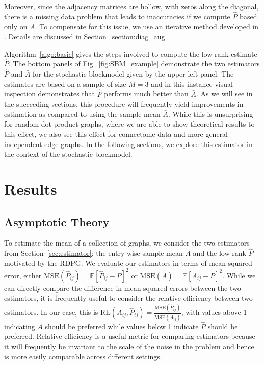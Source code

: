 \documentclass[10pt,letterpaper]{article}
\newcommand{\Ex}{\mathbb{E}}
\renewcommand{\hat}{\widehat}
\begin{document}
Moreover, since the adjacency matrices are hollow, with zeros along the diagonal, there is a missing data problem that leads to inaccuracies if we compute $\hat{P}$ based only on $\bar{A}$. 
To compensate for this issue, we use an iterative method developed in \citet{scheinerman2010modeling}. 
Details are discussed in Section~\ref{section:diag_aug}.





Algorithm~\ref{algo:basic} gives the steps involved to compute the low-rank estimate $\hat{P}$.
The bottom panels of Fig.~\ref{fig:SBM_example} demonstrate the two estimators $\hat{P}$ and $\bar{A}$ for the stochastic blockmodel given by the upper left panel. 
The estimates are based on a sample of size $M=3$ and in this instance visual inspection demonstrates that $\hat{P}$ performs much better than $\bar{A}$.
As we will see in the succeeding sections, this procedure will frequently yield improvements in estimation as compared to using the sample mean $\bar{A}$.
While this is unsurprising for random dot product graphs, where we are able to show theoretical results to this effect, we also see this effect for connectome data and more general independent edge graphs.
In the following sections, we explore this estimator in the context of the stochastic blockmodel.



\section{Results}
\label{sec:result}

\subsection{Asymptotic Theory}
\label{section:theoretical_result}
To estimate the mean of a collection of graphs, we consider the two estimators from Section~\ref{sec:estimator}: the entry-wise sample mean $\bar{A}$ and the low-rank $\hat{P}$ motivated by the RDPG.
We evaluate our estimators in terms of mean squared error, either $\mathrm{MSE}(\hat{P}_{ij})=\Ex[\hat{P}_{ij}-P]^2$ or $\mathrm{MSE}(\bar{A})=\Ex[\bar{A}_{ij}-P]^2$.
While we can directly compare the difference in mean squared errors between the two estimators, it is frequently useful to consider the relative efficiency between two estimators.
In our case, this is $\mathrm{RE}(\bar{A}_{ij},\hat{P}_{ij}) = \frac{\mathrm{MSE}(\hat{P}_{ij})}{\mathrm{MSE}(\bar{A}_{ij})}$, with values above 1 indicating $\bar{A}$ should be preferred while values below 1 indicate $\hat{P}$ should be preferred.
Relative efficiency is a useful metric for comparing estimators because it will frequently be invariant to the scale of the noise in the problem and hence is more easily comparable across different settings.
\end{document}
